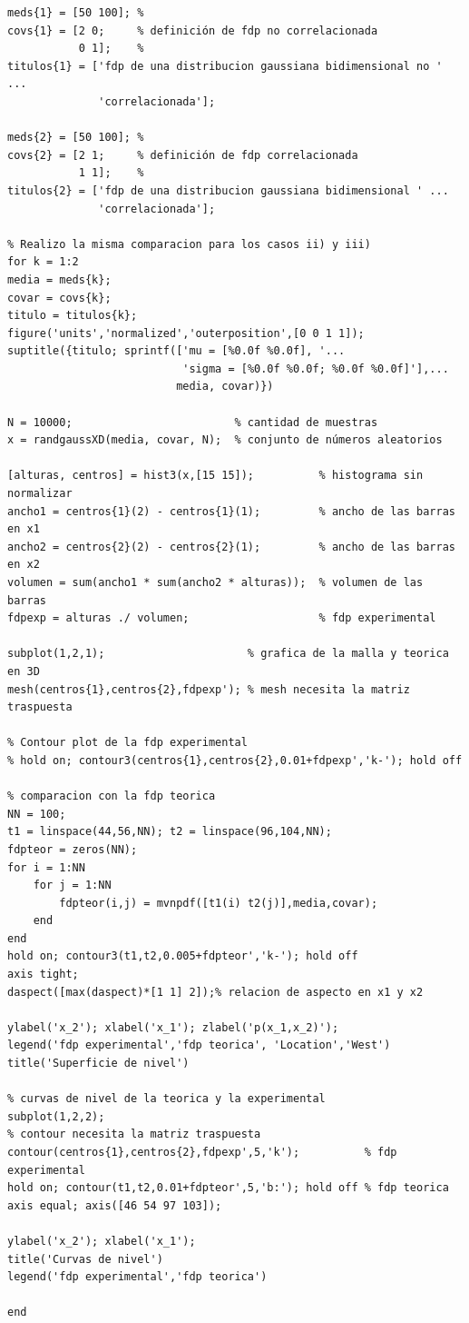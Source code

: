 \documentclass[11pt,a4paper,final]{article}
\begin{document}
\begin{verbatim}
meds{1} = [50 100]; %
covs{1} = [2 0;     % definición de fdp no correlacionada
           0 1];    %
titulos{1} = ['fdp de una distribucion gaussiana bidimensional no ' ...
              'correlacionada'];

meds{2} = [50 100]; %
covs{2} = [2 1;     % definición de fdp correlacionada
           1 1];    %
titulos{2} = ['fdp de una distribucion gaussiana bidimensional ' ...
              'correlacionada'];

% Realizo la misma comparacion para los casos ii) y iii)
for k = 1:2
media = meds{k};
covar = covs{k};
titulo = titulos{k};
figure('units','normalized','outerposition',[0 0 1 1]);
suptitle({titulo; sprintf(['mu = [%0.0f %0.0f], '...
                           'sigma = [%0.0f %0.0f; %0.0f %0.0f]'],...
                          media, covar)})

N = 10000;                         % cantidad de muestras
x = randgaussXD(media, covar, N);  % conjunto de números aleatorios

[alturas, centros] = hist3(x,[15 15]);          % histograma sin normalizar
ancho1 = centros{1}(2) - centros{1}(1);         % ancho de las barras en x1
ancho2 = centros{2}(2) - centros{2}(1);         % ancho de las barras en x2
volumen = sum(ancho1 * sum(ancho2 * alturas));  % volumen de las barras
fdpexp = alturas ./ volumen;                    % fdp experimental

subplot(1,2,1);                      % grafica de la malla y teorica en 3D
mesh(centros{1},centros{2},fdpexp'); % mesh necesita la matriz traspuesta

% Contour plot de la fdp experimental
% hold on; contour3(centros{1},centros{2},0.01+fdpexp','k-'); hold off

% comparacion con la fdp teorica
NN = 100;
t1 = linspace(44,56,NN); t2 = linspace(96,104,NN);
fdpteor = zeros(NN);
for i = 1:NN
    for j = 1:NN
        fdpteor(i,j) = mvnpdf([t1(i) t2(j)],media,covar);
    end
end
hold on; contour3(t1,t2,0.005+fdpteor','k-'); hold off
axis tight;
daspect([max(daspect)*[1 1] 2]);% relacion de aspecto en x1 y x2

ylabel('x_2'); xlabel('x_1'); zlabel('p(x_1,x_2)');
legend('fdp experimental','fdp teorica', 'Location','West')
title('Superficie de nivel')

% curvas de nivel de la teorica y la experimental
subplot(1,2,2);
% contour necesita la matriz traspuesta
contour(centros{1},centros{2},fdpexp',5,'k');          % fdp experimental
hold on; contour(t1,t2,0.01+fdpteor',5,'b:'); hold off % fdp teorica
axis equal; axis([46 54 97 103]);

ylabel('x_2'); xlabel('x_1');
title('Curvas de nivel')
legend('fdp experimental','fdp teorica')

end
\end{verbatim}
\end{document}
